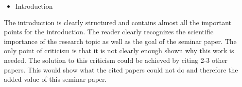 \documentclass[12pt]{scrartcl}
\begin{document}
\begin{itemize}
 \item Introduction
\end{itemize}
The introduction is clearly structured and contains almost all the important points for the introduction. The reader clearly recognizes the scientific importance of the research topic as well as the goal of the seminar paper. The only point of criticism is that it is not clearly enough shown why this 
work is needed. The solution to this criticism could be achieved by citing 2-3 other papers. This would show what the cited papers could not do and therefore the added value of this seminar paper. 
\end{document}
